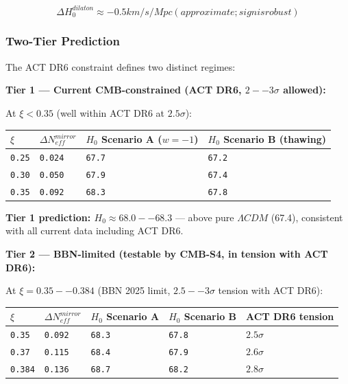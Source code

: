 \documentclass[aps,prd,preprint,superscriptaddress,longbibliography,floatfix]{revtex4-2}
\theoremstyle{remark}
\begin{document}
\begin{equation}
    \Delta H_{0}^{dilaton} \approx -0.5 km/s/Mpc  (approximate; sign is robust)
\end{equation}

\subsubsection{Two-Tier Prediction}

The ACT DR6 constraint defines two distinct regimes:


\textbf{Tier 1 --- Current CMB-constrained (ACT DR6, $2--3\sigma$ allowed):}

At $\xi < 0.35$ (well within ACT DR6 at $2.5\sigma$):


\begin{table}[H]
\begin{ruledtabular}
\begin{tabular}{p{3.8cm}p{3.8cm}p{3.8cm}p{3.8cm}}
$\xi$ & $\Delta N_{eff}^{mirror}$ & $H_{0}$ Scenario A ($w=-1$) & $H_{0}$ Scenario B (thawing) \\
\hline
\texttt{0.25} & \texttt{0.024} & \texttt{67.7} & \texttt{67.2} \\
\texttt{0.30} & \texttt{0.050} & \texttt{67.9} & \texttt{67.4} \\
\texttt{0.35} & \texttt{0.092} & \texttt{68.3} & \texttt{67.8} \\
\end{tabular}
\end{ruledtabular}
\end{table}

\textbf{Tier 1 prediction: $H_{0} \approx 68.0--68.3$} --- above pure $\Lambda CDM$ (67.4), consistent with all current data including ACT DR6.


\textbf{Tier 2 --- BBN-limited (testable by CMB-S4, in tension with ACT DR6):}

At $\xi = 0.35--0.384$ (BBN 2025 limit, $2.5--3\sigma$ tension with ACT DR6):


\begin{table}[H]
\begin{ruledtabular}
\begin{tabular}{p{3.0cm}p{3.0cm}p{3.0cm}p{3.0cm}p{3.0cm}}
$\xi$ & $\Delta N_{eff}^{mirror}$ & $H_{0}$ Scenario A & $H_{0}$ Scenario B & ACT DR6 tension \\
\hline
\texttt{0.35} & \texttt{0.092} & \texttt{68.3} & \texttt{67.8} & $2.5\sigma$ \\
\texttt{0.37} & \texttt{0.115} & \texttt{68.4} & \texttt{67.9} & $2.6\sigma$ \\
\texttt{0.384} & \texttt{0.136} & \texttt{68.7} & \texttt{68.2} & $2.8\sigma$ \\
\end{tabular}
\end{ruledtabular}
\end{table}
\end{document}
